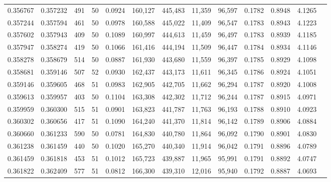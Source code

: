 \begin{tabular}{rrrrrrrrrrrrr}
0.356767 & 0.357232 &   491 &  50 &                                     0.0924 & 160,127 & 445,483 &  11,359 &  96,597 & 0.1782 & 0.8948 & 4.1265 \\
0.357244 & 0.357594 &   461 &  50 &                                     0.0978 & 160,588 & 445,022 &  11,409 &  96,547 & 0.1783 & 0.8943 & 4.1223 \\
0.357602 & 0.357943 &   409 &  50 &                                     0.1089 & 160,997 & 444,613 &  11,459 &  96,497 & 0.1783 & 0.8939 & 4.1185 \\
0.357947 & 0.358274 &   419 &  50 &                                     0.1066 & 161,416 & 444,194 &  11,509 &  96,447 & 0.1784 & 0.8934 & 4.1146 \\
0.358278 & 0.358679 &   514 &  50 &                                     0.0887 & 161,930 & 443,680 &  11,559 &  96,397 & 0.1785 & 0.8929 & 4.1098 \\
0.358681 & 0.359146 &   507 &  52 &                                     0.0930 & 162,437 & 443,173 &  11,611 &  96,345 & 0.1786 & 0.8924 & 4.1051 \\
0.359146 & 0.359605 &   468 &  51 &                                     0.0983 & 162,905 & 442,705 &  11,662 &  96,294 & 0.1787 & 0.8920 & 4.1008 \\
0.359613 & 0.359957 &   403 &  50 &                                     0.1104 & 163,308 & 442,302 &  11,712 &  96,244 & 0.1787 & 0.8915 & 4.0971 \\
0.359959 & 0.360300 &   515 &  51 &                                     0.0901 & 163,823 & 441,787 &  11,763 &  96,193 & 0.1788 & 0.8910 & 4.0923 \\
0.360302 & 0.360656 &   417 &  51 &                                     0.1090 & 164,240 & 441,370 &  11,814 &  96,142 & 0.1789 & 0.8906 & 4.0884 \\
0.360660 & 0.361233 &   590 &  50 &                                     0.0781 & 164,830 & 440,780 &  11,864 &  96,092 & 0.1790 & 0.8901 & 4.0830 \\
0.361238 & 0.361459 &   440 &  50 &                                     0.1020 & 165,270 & 440,340 &  11,914 &  96,042 & 0.1791 & 0.8896 & 4.0789 \\
0.361459 & 0.361818 &   453 &  51 &                                     0.1012 & 165,723 & 439,887 &  11,965 &  95,991 & 0.1791 & 0.8892 & 4.0747 \\
0.361822 & 0.362409 &   577 &  51 &                                     0.0812 & 166,300 & 439,310 &  12,016 &  95,940 & 0.1792 & 0.8887 & 4.0693 \\

\end{tabular}
